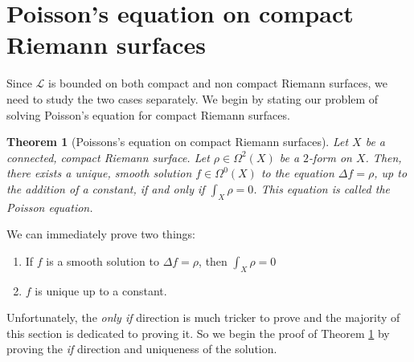 \documentclass[11pt]{report}
\newtheorem{thm}{Theorem}[section]
\theoremstyle{definition}
\begin{document}
\section{Poisson's equation on compact Riemann surfaces}
Since $\mathcal{L}$ is bounded on both compact and non compact Riemann surfaces, we need to study the two cases separately. We begin by stating our problem of solving Poisson's equation for compact Riemann surfaces.
\begin{thm}[Poissons's equation on compact Riemann surfaces]\label{compactPoisson}
  Let $X$ be a connected, compact Riemann surface. Let $\rho \in \Omega^2(X)$ be a $2$-form on $X$. Then, there exists a unique, smooth solution $f \in \Omega^0(X)$ to the equation $\Delta f = \rho$, up to the addition of a constant, if and only if $\int_X \rho = 0$. This equation is called the Poisson equation.
\end{thm}
We can immediately prove two things:
\begin{enumerate}
  \item If $f$ is a smooth solution to $\Delta f = \rho$, then $\int_X \rho= 0$
  \item $f$ is unique up to a constant.
\end{enumerate}
Unfortunately, the \emph{only if} direction is much tricker to prove and the majority of this section is dedicated to proving it. So we begin the proof of Theorem \ref{compactPoisson} by proving the \emph{if} direction and uniqueness of the solution.
\end{document}
